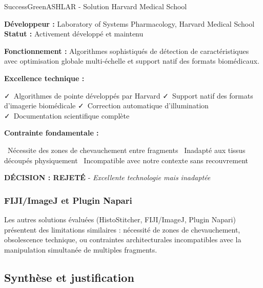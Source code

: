 \documentclass[11pt,a4paper]{report}
\newcommand{\pro}[1]{\textcolor{SuccessGreen}{\faCheck\ #1}}
\newcommand{\con}[1]{\textcolor{DangerRed}{\faTimes\ #1}}
\begin{document}
\begin{techbox}{SuccessGreen}{ASHLAR - Solution Harvard Medical School}

\textbf{Développeur :} Laboratory of Systems Pharmacology, Harvard Medical School \\
\textbf{Statut :} Activement développé et maintenu

\vspace{0.5cm}

\textbf{Fonctionnement :} Algorithmes sophistiqués de détection de caractéristiques avec optimisation globale multi-échelle et support natif des formats biomédicaux.

\textbf{Excellence technique :}
\begin{itemize}[leftmargin=*]
    \pro{Algorithmes de pointe développés par Harvard}
    \pro{Support natif des formats d'imagerie biomédicale}
    \pro{Correction automatique d'illumination}
    \pro{Documentation scientifique complète}
\end{itemize}

\textbf{Contrainte fondamentale :}
\begin{itemize}[leftmargin=*]
    \con{Nécessite des zones de chevauchement entre fragments}
    \con{Inadapté aux tissus découpés physiquement}
    \con{Incompatible avec notre contexte sans recouvrement}
\end{itemize}

\begin{center}
\textbf{\textcolor{WarningOrange}{DÉCISION : REJETÉ}} - \textit{Excellente technologie mais inadaptée}
\end{center}

\end{techbox}

\subsubsection{FIJI/ImageJ et Plugin Napari}

Les autres solutions évaluées (HistoStitcher, FIJI/ImageJ, Plugin Napari) présentent des limitations similaires : nécessité de zones de chevauchement, obsolescence technique, ou contraintes architecturales incompatibles avec la manipulation simultanée de multiples fragments.

\subsection{Synthèse et justification}
\end{document}
